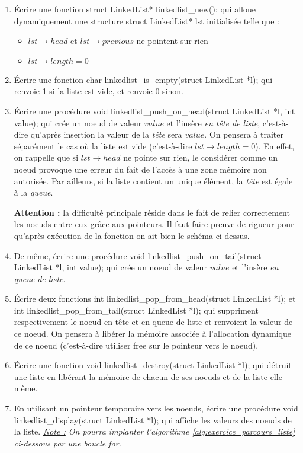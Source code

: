 \documentclass[../../../main.tex]{subfiles}
\begin{document}
\begin{enumerate}
	\begin{minipage}{\textwidth}
	\begin{center}
	
	\end{center}
	\end{minipage}
	\item Écrire une fonction \textsf{struct LinkedList* linkedlist\_new();} qui alloue dynamiquement une structure \textsf{struct LinkedList* lst} initialisée telle que :
	\begin{itemize}
		\item $lst\rightarrow head$ et $lst\rightarrow previous$ ne pointent sur rien
		\item $lst\rightarrow length = 0$
	\end{itemize}
	\item Écrire une fonction \textsf{char linkedlist\_is\_empty(struct LinkedList *l);} qui renvoie \textsf{1} si la liste est vide, et renvoie \textsf{0} sinon.
	\item Écrire une procédure \textsf{void linkedlist\_push\_on\_head(struct LinkedList *l, int value);} qui crée un noeud de valeur $value$ et l'insère \textit{en tête de liste}, c'est-à-dire qu'après insertion la valeur de la \textit{tête} sera $value$. On pensera à traiter séparément le cas où la liste est vide (c'est-à-dire $lst\rightarrow length = 0$). En effet, on rappelle que si $lst\rightarrow head$ ne pointe sur rien, le considérer comme un noeud provoque une erreur du fait de l'accès à une zone mémoire non autorisée. Par ailleurs, si la liste contient un unique élément, la \textit{tête} est égale à la \textit{queue}.

	\textbf{Attention :} la difficulté principale réside dans le fait de relier correctement les noeuds entre eux grâce aux pointeurs. Il faut faire preuve de rigueur pour qu'après exécution de la fonction on ait bien le schéma ci-dessus.
	\item De même, écrire une procédure \textsf{void linkedlist\_push\_on\_tail(struct LinkedList *l, int value);} qui crée un noeud de valeur $value$ et l'insère \textit{en queue de liste}.
	\item Écrire deux fonctions \textsf{int linkedlist\_pop\_from\_head(struct LinkedList *l);} et \textsf{int linkedlist\_pop\_from\_tail(struct LinkedList *l);} qui suppriment respectivement le noeud en tête et en queue de liste et renvoient la valeur de ce noeud. On pensera à libérer la mémoire associée à l'allocation dynamique de ce noeud (c'est-à-dire utiliser \textsf{free} sur le pointeur vers le noeud).
	\item Écrire une fonction \textsf{void linkedlist\_destroy(struct LinkedList *l);} qui détruit une liste en libérant la mémoire de chacun de ses noeuds et de la liste elle-même.
	\item En utilisant un pointeur temporaire vers les noeuds, écrire une procédure \textsf{void linkedlist\_display(struct LinkedList *l);} qui affiche les valeurs des noeuds de la liste.\newline
	\textit{\underline{Note :} On pourra implanter l'algorithme \ref{alg:exercice_parcours_liste} ci-dessous par une boucle \textit{for}.}
\end{enumerate}
\end{document}
